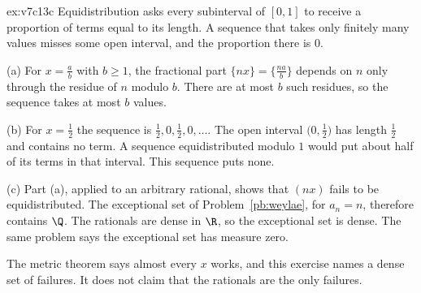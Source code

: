 \begin{solution}{ex:v7c13c}
\idea Equidistribution asks every subinterval of $[0,1]$ to receive a proportion of terms equal to its length. A sequence that takes only finitely many values misses some open interval, and the proportion there is $0$.

\writeup (a) For $x=\frac ab$ with $b\ge 1$, the fractional part $\{nx\}=\bigl\{\frac{na}{b}\bigr\}$ depends on $n$ only through the residue of $n$ modulo $b$. There are at most $b$ such residues, so the sequence takes at most $b$ values.

(b) For $x=\frac12$ the sequence is $\frac12,0,\frac12,0,\dots$. The open interval $\bigl(0,\frac12\bigr)$ has length $\frac12$ and contains no term. A sequence equidistributed modulo $1$ would put about half of its terms in that interval. This sequence puts none.

(c) Part (a), applied to an arbitrary rational, shows that $(nx)$ fails to be equidistributed. The exceptional set of Problem~\ref{pb:weylae}, for $a_n=n$, therefore contains $\Q$. The rationals are dense in $\R$, so the exceptional set is dense. The same problem says the exceptional set has measure zero.

\leads The metric theorem says almost every $x$ works, and this exercise names a dense set of failures. It does not claim that the rationals are the only failures.
\end{solution}

